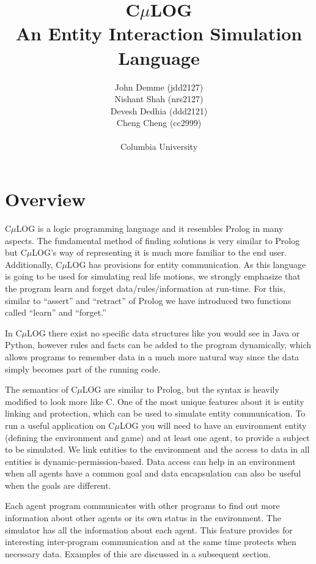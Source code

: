 \documentclass[onecolumn,titlepage]{article}
\begin{document}
\title{C$\mu$LOG\\\small{An Entity Interaction Simulation Language}}
\author{John Demme (jdd2127)\\Nishant Shah (nrs2127)\\Devesh Dedhia (ddd2121)\\Cheng Cheng (cc2999)
\\ \\Columbia University}

\maketitle

\section{Overview}
C$\mu$LOG is a logic programming language and it resembles Prolog in many aspects.
The fundamental method of finding solutions is very similar to Prolog but C$\mu$LOG's
way of representing it is much more familiar to the end user. Additionally, C$\mu$LOG
has provisions for entity communication. As this language is going to be used for simulating 
real life motions, we
strongly emphasize that the program learn and forget data/rules/information at
run-time. For this, similar to ``assert'' and ``retract'' of Prolog we have
introduced two functions called ``learn'' and ``forget.''
  
In C$\mu$LOG there exist no specific data structures like you would see in Java or Python,
however rules and facts can be added to the program dynamically, which allows programs to
remember data in a much more natural way since the data simply becomes part of the running code.

The semantics of C$\mu$LOG are similar to Prolog, but the syntax is heavily modified to look 
more like C.  One of the most unique features about it is entity linking
and protection, which can be used to simulate entity communication.
To run a useful application on C$\mu$LOG you
will need to have an environment entity (defining the environment and game) and at least one agent,
 to provide a subject to be simulated. We link entities to the environment and the
access to data in all entities is dynamic-permission-based. Data access can help in an environment
when all agents have a common goal and data encapsulation can also be useful when the goals
are different.

Each agent program communicates with other programs to find out more information about
other agents or its own status in the environment. The simulator has all the information 
about each agent. This feature provides for interesting inter-program communication and at the same
time protects when necessary data. Examples of this are discussed in a subsequent section.
\end{document}
